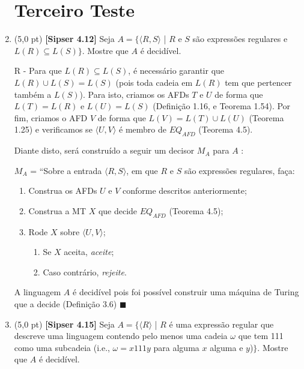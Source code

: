 \documentclass[12pt,a4paper,oneside]{article}
\begin{document}
\begin{enumerate}
	
	\section{Terceiro Teste}
	
	\item (5,0 pt)	{\bf [Sipser 4.12]} Seja $A = \{\langle R,S \rangle$ | $R$ e $S$ são expressões regulares e $L(R) \subseteq L(S)\}$. Mostre que $A$ é decidível.
	
	\vspace{0.3cm}
	
	{\color{blue}
		R - Para que $L(R) \subseteq L(S)$, é necessário garantir que $L(R) \cup L(S) = L(S)$ (pois toda cadeia em $L(R)$ tem que pertencer também a $L(S)$). Para isto, criamos os AFDs $T$ e $U$ de forma que $L(T) = L(R)$ e $L(U) = L(S)$ (Definição 1.16, e Teorema 1.54). Por fim, criamos o AFD $V$ de forma que $L(V) = L(T) \cup L(U)$ (Teorema 1.25) e verificamos se $\langle U, V \rangle$ é membro de $EQ_{AFD}$ (Teorema 4.5).
		
		Diante disto, será construído a seguir um decisor $M_A$ para $A$ :
		
		$M_A$ = ``Sobre a entrada $\langle R, S \rangle$, em que $R$ e $S$ são expressões regulares, faça:
		\begin{enumerate}
			\item Construa os AFDs $U$ e $V$ conforme descritos anteriormente;
			\item Construa a MT $X$ que decide $EQ_{AFD}$ (Teorema 4.5);
			\item Rode $X$ sobre $\langle U, V \rangle$;
			\begin{enumerate}
				\item Se $X$ aceita, {\it aceite};
				\item Caso contrário, {\it rejeite}.
			\end{enumerate}					
		\end{enumerate}
		
		A linguagem $A$ é decidível pois foi possível construir uma máquina de Turing que a decide (Definição 3.6) $\blacksquare$
		
	}

	\newpage

	\item (5,0 pt) {\bf [Sipser 4.15]}  Seja $A = \{\langle R \rangle$ | $R$ é uma expressão regular que descreve uma linguagem contendo pelo menos uma cadeia $\omega$ que tem 111 como uma subcadeia (i.e., $\omega = x111y$ para alguma $x$ alguma e $y$)$\}$. Mostre que $A$ é decidível.
	

\end{enumerate}
\end{document}
